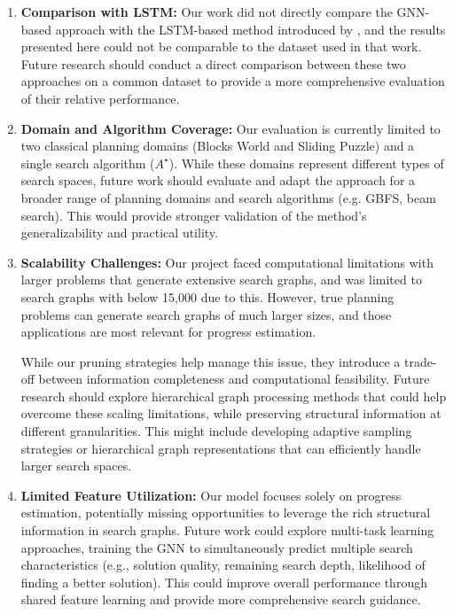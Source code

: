 \documentclass[letterpaper]{article}
\newcommand{\naomi}[1]{{\color{magenta}{Naomi: #1}}}
\begin{document}
\begin{enumerate}
    \item \textbf{Comparison with LSTM:} Our work did not directly compare the GNN-based approach with the LSTM-based method introduced by \citet{sudry2022learning}, and the results presented here could not be comparable to the dataset used in that work. Future research should conduct a direct comparison between these two approaches on a common dataset to provide a more comprehensive evaluation of their relative performance. \naomi{revise this}

    \item \textbf{Domain and Algorithm Coverage:} Our evaluation is currently limited to two classical planning domains (Blocks World and Sliding Puzzle) and a single search algorithm ($A^{\star}$). While these domains represent different types of search spaces, future work should evaluate and adapt the approach for a broader range of planning domains and search algorithms (e.g. GBFS, beam search). This would provide stronger validation of the method's generalizability and practical utility.

    \item \textbf{Scalability Challenges:} Our project faced computational limitations with larger problems that generate extensive search graphs, and was limited to search graphs with below 15,000 due to this. However, true planning problems can generate search graphs of much larger sizes, and those applications are most relevant for progress estimation.

    While our pruning strategies help manage this issue, they introduce a trade-off between information completeness and computational feasibility. Future research should explore hierarchical graph processing methods that could help overcome these scaling limitations, while preserving structural information at different granularities. This might include developing adaptive sampling strategies or hierarchical graph representations that can efficiently handle larger search spaces.

    \item \textbf{Limited Feature Utilization:} Our model focuses solely on progress estimation, potentially missing opportunities to leverage the rich structural information in search graphs. Future work could explore multi-task learning approaches, training the GNN to simultaneously predict multiple search characteristics (e.g., solution quality, remaining search depth, likelihood of finding a better solution). This could improve overall performance through shared feature learning and provide more comprehensive search guidance.
\end{enumerate}
\end{document}
